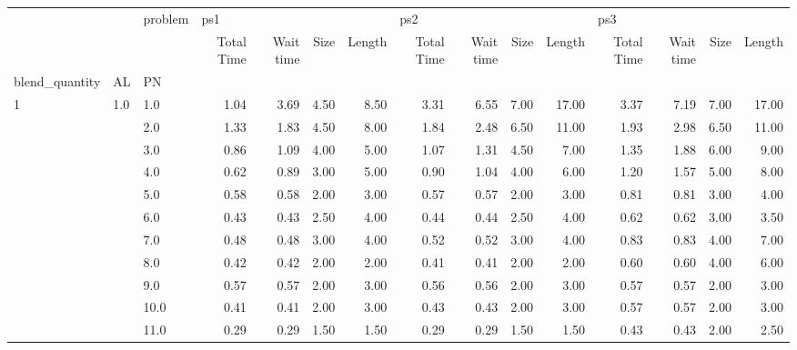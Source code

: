 \begin{tabular}{lllrrrrrrrrrrrr}
\toprule
     &     & problem & \multicolumn{4}{l}{ps1} & \multicolumn{4}{l}{ps2} & \multicolumn{4}{l}{ps3} \\
     &     & {} & Total Time & Wait time & Size & Length & Total Time & Wait time & Size & Length & Total Time & Wait time & Size & Length \\
blend\_quantity & AL & PN &            &           &      &        &            &           &      &        &            &           &      &        \\
\midrule
1 & 1.0 & 1.0  &       1.04 &      3.69 & 4.50 &   8.50 &       3.31 &      6.55 & 7.00 &  17.00 &       3.37 &      7.19 & 7.00 &  17.00 \\
     &     & 2.0  &       1.33 &      1.83 & 4.50 &   8.00 &       1.84 &      2.48 & 6.50 &  11.00 &       1.93 &      2.98 & 6.50 &  11.00 \\
     &     & 3.0  &       0.86 &      1.09 & 4.00 &   5.00 &       1.07 &      1.31 & 4.50 &   7.00 &       1.35 &      1.88 & 6.00 &   9.00 \\
     &     & 4.0  &       0.62 &      0.89 & 3.00 &   5.00 &       0.90 &      1.04 & 4.00 &   6.00 &       1.20 &      1.57 & 5.00 &   8.00 \\
     &     & 5.0  &       0.58 &      0.58 & 2.00 &   3.00 &       0.57 &      0.57 & 2.00 &   3.00 &       0.81 &      0.81 & 3.00 &   4.00 \\
     &     & 6.0  &       0.43 &      0.43 & 2.50 &   4.00 &       0.44 &      0.44 & 2.50 &   4.00 &       0.62 &      0.62 & 3.00 &   3.50 \\
     &     & 7.0  &       0.48 &      0.48 & 3.00 &   4.00 &       0.52 &      0.52 & 3.00 &   4.00 &       0.83 &      0.83 & 4.00 &   7.00 \\
     &     & 8.0  &       0.42 &      0.42 & 2.00 &   2.00 &       0.41 &      0.41 & 2.00 &   2.00 &       0.60 &      0.60 & 4.00 &   6.00 \\
     &     & 9.0  &       0.57 &      0.57 & 2.00 &   3.00 &       0.56 &      0.56 & 2.00 &   3.00 &       0.57 &      0.57 & 2.00 &   3.00 \\
     &     & 10.0 &       0.41 &      0.41 & 2.00 &   3.00 &       0.43 &      0.43 & 2.00 &   3.00 &       0.57 &      0.57 & 2.00 &   3.00 \\
     &     & 11.0 &       0.29 &      0.29 & 1.50 &   1.50 &       0.29 &      0.29 & 1.50 &   1.50 &       0.43 &      0.43 & 2.00 &   2.50 \\

\end{tabular}
